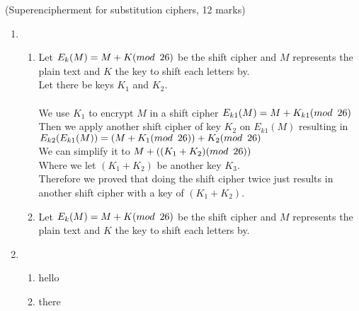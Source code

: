 \documentclass{assignment}
\begin{document}
\begin{problemlist}
\pbitem (Superencipherment for substitution ciphers, 12 marks)
\begin{problem}
\begin{answer}
\begin{enumerate}[label=(\alph*)]
	\item	\begin{enumerate}[label=(\roman*)]
			\item Let $ E_k(M) = M + K (mod \hspace{.5em} 26) $ be the shift cipher and $M$ represents the plain text 
				  and $K$ the key to shift each letters by. \\
				  Let there be keys $K_1$ and $K_2$. \\
				  \\
				  We use $K_1$ to encrypt $M$ in a shift cipher $E_{k1}(M) =  M + K_{k1} (mod \hspace{.5em} 26) $ \\
				  Then we apply another shift cipher of key $K_2$ on $E_{k1}(M)$ resulting in $E_{k2}(E_{k1}(M)) = (M + K_{1} (mod \hspace{.5em} 26)) + K_{2} (mod \hspace{.5em} 26) $ \\
				  We can simplify it to $M + ((K_{1} + K_{2}) (mod \hspace{.5em} 26)) $ \\
				  Where we let $(K_1 + K_2)$ be another key $K_3$. \\
				  Therefore we proved that doing the shift cipher twice just results in another shift cipher with a key of $(K_1 + K_2)$. \\

			
\clearpage				  
				
			\item Let $ E_k(M) = M + K (mod \hspace{.5em} 26) $ be the shift cipher and $M$ represents the plain text 
				  and $K$ the key to shift each letters by. \\
			\end{enumerate}


	\item 	\begin{enumerate}[label=(\roman*)]
			\item hello
			\item there
			\end{enumerate}
\end{enumerate}
\end{answer}
\end{problem}


\end{problemlist}
\end{document}
